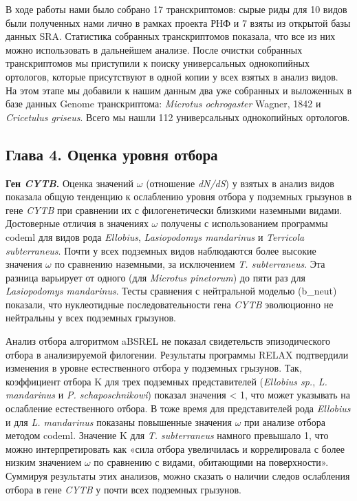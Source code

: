 В ходе работы нами было собрано 17 транскриптомов: сырые риды для 10 видов были полученных нами лично в рамках проекта РНФ и 7 взяты из открытой базы данных SRA. Статистика собранных транскриптомов показала, что все из них можно использовать в дальнейшем анализе. После очистки собранных транскриптомов мы приступили к поиску универсальных однокопийных ортологов, которые присутствуют в одной копии у всех взятых в анализ видов. На этом этапе мы добавили к нашим данным два уже собранных и выложенных в базе данных Genome транскриптома: \textit{Microtus ochrogaster} Wagner, 1842 и \textit{Cricetulus griseus}. Всего мы нашли 112 универсальных однокопийных ортологов. 

\subsection*{Глава 4. Оценка уровня отбора}

\textbf{Ген \textit{CYTB}.} Оценка значений $\omega$ (отношение \textit{dN/dS}) у взятых в анализ видов показала общую тенденцию к ослаблению уровня отбора у подземных грызунов в гене \textit{CYTB} при сравнении их с филогенетически близкими наземными видами. Достоверные отличия в значениях $\omega$ получены с использованием программы codeml для видов рода \textit{Ellobius}, \textit{Lasiopodomys mandarinus} и \textit{Terricola subterraneus}. Почти у всех подземных видов наблюдаются более высокие значения $\omega$ по сравнению наземными, за исключением \textit{T. subterraneus}. Эта разница варьирует от одного (для \textit{Microtus pinetorum}) до пяти раз для \textit{Lasiopodomys mandarinus}. Тесты сравнения с нейтральной моделью (b\_neut) показали, что нуклеотидные последовательности гена \textit{CYTB} эволюционно не нейтральны у всех подземных грызунов. 

Анализ отбора алгоритмом aBSREL не показал свидетельств эпизодического отбора в анализируемой филогении. Результаты программы RELAX подтвердили изменения в уровне естественного отбора у подземных грызунов. Так, коэффициент отбора K для трех подземных представителей (\textit{Ellobius sp.}, \textit{L. mandarinus} и \textit{P. schaposchnikowi}) показал значения < 1, что может указывать на ослабление естественного отбора. В тоже время для представителей рода \textit{Ellobius} и для \textit{L. mandarinus} показаны повышенные значения $\omega$ при анализе отбора методом codeml. Значение K для \textit{T. subterraneus} намного превышало 1, что можно интерпретировать как «сила отбора увеличилась и коррелировала с более низким значением $\omega$ по сравнению с видами, обитающими на поверхности». Суммируя результаты этих анализов, можно сказать о наличии следов ослабления отбора в гене \textit{CYTB} у почти всех подземных грызунов.

